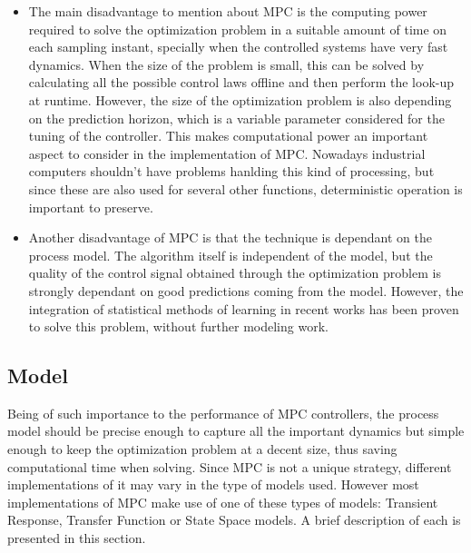 \begin{itemize}

\item The main disadvantage to mention about MPC is the computing power required to solve the optimization problem in a suitable amount of time on each sampling instant, specially when the controlled systems have very fast dynamics. When the size of the problem is small, this can be solved by calculating all the possible control laws offline and then perform the look-up at runtime. However, the size of the optimization problem is also depending on the prediction horizon, which is a variable parameter considered for the tuning of the controller. This makes computational power an important aspect to consider in the implementation of MPC. Nowadays industrial computers shouldn't have problems hanlding this kind of processing, but since these are also used for several other functions, deterministic operation is important to preserve.

\item Another disadvantage of MPC is that the technique is dependant on the process model. The algorithm itself is independent of the model, but the quality of the control signal obtained through the optimization problem is strongly dependant on good predictions coming from the model. However, the integration of statistical methods of learning in recent works \cite{Bouffard2012} has been proven to solve this problem, without further modeling work.

\end{itemize}

\subsection{Model}%

Being of such importance to the performance of MPC controllers, the process model should be precise enough to capture all the important dynamics but simple enough to keep the optimization problem at a decent size, thus saving computational time when solving. Since MPC is not a unique strategy, different implementations of it may vary in the type of models used. However most implementations of MPC make use of one of these types of models: Transient Response, Transfer Function or State Space models. A brief description of each is presented in this section.

